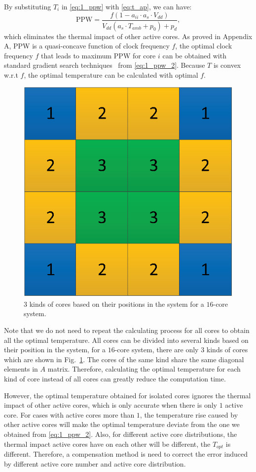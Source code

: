 By substituting $T_{i}$ in \eqref{eq:1_ppw} with \eqref{eq:t_ap}, we can have:
\begin{equation}\label{eq:1_ppw_2}
\text{PPW} = \frac{f(1-a_{ii} \cdot a_{s} \cdot V_{dd})}{V_{dd}(a_{s}\cdot T_{amb}+p_{0})+p_{d}},
\end{equation}
which eliminates the thermal impact of other active cores. As proved in Appendix A, PPW is a quasi-concave function of clock frequency $f$, the optimal clock frequency $f$ that leads to maximum PPW for core $i$ can be obtained with standard gradient search techniques~\cite{Boyd:Convex_BOOK'06} from \eqref{eq:1_ppw_2}. Because $T$ is convex w.r.t $f$, the optimal temperature can be calculated with optimal $f$.

\begin{figure}
\centering
\includegraphics[width=0.46\linewidth]{fig/unique_position.eps}
\caption{$3$ kinds of cores based on their positions in the system for a $16$-core system.}
\label{fig:unique_position}
\end{figure}

Note that we do not need to repeat the calculating process for all cores to obtain all the optimal temperature. All cores can be divided into several kinds based on their position in the system, for a $16$-core system, there are only $3$ kinds of cores which are shown in Fig.~\ref{fig:unique_position}. The cores of the same kind share the same diagonal elements in $A$ matrix. Therefore, calculating the optimal temperature for each kind of core instead of all cores can greatly reduce the computation time.

However, the optimal temperature obtained for isolated cores ignores the thermal impact of other active cores, which is only accurate when there is only $1$ active core. For cases with active cores more than $1$, the temperature rise caused by other active cores will make the optimal temperature deviate from the one we obtained from \eqref{eq:1_ppw_2}. Also, for different active core distributions, the thermal impact active cores have on each other will be different, the $\hat{T}_{opt}$ is different. Therefore, a compensation method is need to correct the error induced by different active core number and active core distribution.

